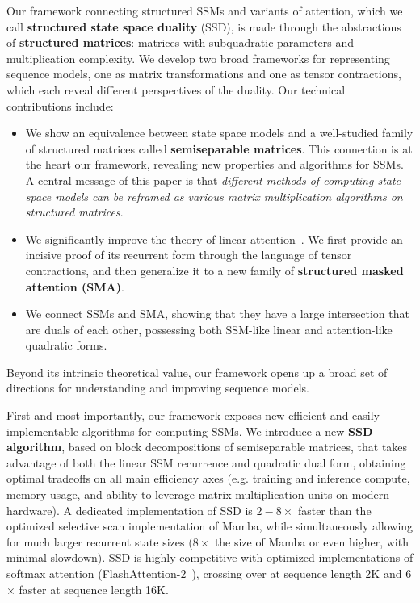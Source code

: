 \documentclass{article}
\newcommand{\citep}{\parencite}
\newcommand{\para}[1]{\iftoggle{arxiv}{\paragraph{#1}}{\textbf{#1}}}
\begin{document}
\para{State Space Duality.}
Our framework connecting structured SSMs and variants of attention, which we call \textbf{structured state space duality} (SSD),
is made through the abstractions of \textbf{structured matrices}:
matrices with subquadratic parameters and multiplication complexity.
We develop two broad frameworks for representing sequence models, one as matrix transformations and one as tensor contractions, which each reveal different perspectives of the duality.
Our technical contributions include:
\begin{itemize}[leftmargin=*,itemsep=0pt,topsep=0pt]
  \item We show an equivalence between state space models and a well-studied family of structured matrices called \textbf{semiseparable matrices}\iftoggle{arxiv}{ (\cref{sec:ssm})}{}.
    This connection is at the heart our framework, revealing new properties and algorithms for SSMs. A central message of this paper is that \emph{different methods of computing state space models can be reframed as various matrix multiplication algorithms on structured matrices}.
  \item We significantly improve the theory of linear attention~\citep{katharopoulos2020transformers}.
    We first provide an incisive proof of its recurrent form through the language of tensor contractions, and then generalize it to a new family of \textbf{structured masked attention (SMA)}\iftoggle{arxiv}{ (\cref{sec:attention})}{}.
  \item We connect SSMs and SMA, showing that they have a large intersection that are duals of each other, possessing both SSM-like linear and attention-like quadratic forms\iftoggle{arxiv}{ (\cref{sec:ssd})}{}.
    \iftoggle{arxiv}{We also prove that any kernel attention method possessing a fast recurrent form must be an SSM.}{}
\end{itemize}

Beyond its intrinsic theoretical value, our framework opens up a broad set of directions for understanding and improving sequence models.

\para{Efficient Algorithms.}
First and most importantly, our framework exposes new efficient and easily-implementable algorithms for computing SSMs\iftoggle{arxiv}{ (\cref{sec:efficient})}{}.
We introduce a new \textbf{SSD algorithm}, based on block decompositions of semiseparable matrices, that takes advantage of both the linear SSM recurrence and quadratic dual form, obtaining optimal tradeoffs on all main efficiency axes (e.g. training and inference compute, memory usage, and ability to leverage matrix multiplication units on modern hardware).
A dedicated implementation of SSD is $2-8\times$ faster than the optimized selective scan implementation of Mamba, while simultaneously allowing for much larger recurrent state sizes ($8\times$ the size of Mamba or even higher, with minimal slowdown).
SSD is highly competitive with optimized implementations of softmax attention (FlashAttention-2~\citep{dao2023flashattention2}), crossing over at sequence length 2K and 6$\times$ faster at sequence length 16K.
\end{document}
